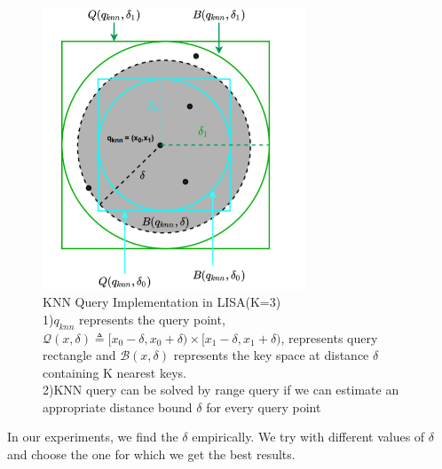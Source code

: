 \begin{figure}[t]
    \centering
    \includegraphics[width=0.7\textwidth]{graphs/KNN_Query_LISA.png}
    \caption{KNN Query Implementation in LISA(K=3)\\
    1)$q_{knn}$ represents the query point, $ \mathcal{Q}(x,\delta) \triangleq [x_{0}-\delta, x_{0}+\delta) \times[x_{1}-\delta, x_{1}+\delta)$, represents query rectangle and $ \mathcal{B}(x, \delta)$ represents the key space at distance $\delta$ containing K nearest keys.\\
    2)KNN query can be solved by range query if we can estimate an appropriate distance bound $\delta$ for every query point\\
    }
    \label{fig:KNN_Query_LISA}
\end{figure}
In our experiments, we find the $\delta$ empirically. We try with different values of $\delta$ and choose the one for which we get the best results. 